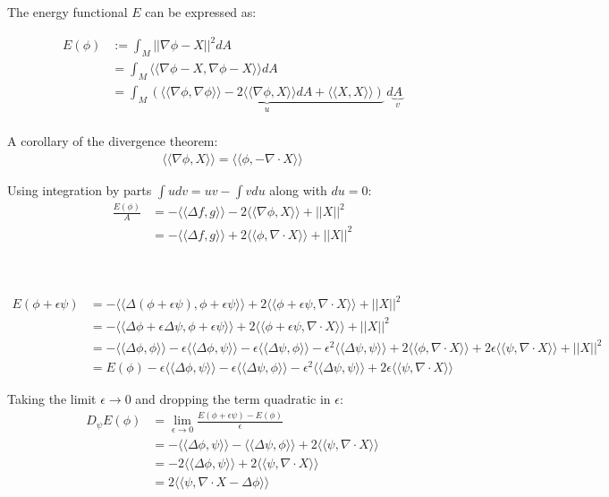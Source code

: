 \documentclass{article}
\def\grad{\nabla}
\def\lap{\Delta}
\def\ll{\langle\langle}
\def\rr{\rangle\rangle}
\begin{document}
The energy functional $E$ can be expressed as:

\begin{align*}
    E(\phi) &:= \int_M || \grad \phi - X ||^2 dA \\
        &= \int_M \ll \grad \phi - X, \grad \phi - X \rr dA \\
        &= \int_M \underbrace{(\ll \grad \phi, \grad \phi \rr - 2 \ll \grad \phi, X \rr dA + \ll X, X \rr)}_u \, d\underbrace{A}_v \\
\end{align*}

A corollary of the divergence theorem:
\begin{align}
    \ll \grad \phi, X \rr = \ll \phi, -\grad \cdot X \rr
\end{align}

Using integration by parts $\int udv = uv - \int vdu$ along with $du = 0$:
\begin{align*}
    \frac{E(\phi)}{A} &= -\ll \lap f, g \rr - 2 \ll \grad \phi, X \rr + ||X||^2 \tag*{from (1)} \\
        &= -\ll \lap f, g \rr + 2 \ll \phi, \grad \cdot X \rr + ||X||^2 \tag*{from (2)}
\end{align*}


\vspace{1.8cm}
\\\\


\begin{align*}
    E(\phi + \epsilon \psi) &= - \ll \lap (\phi + \epsilon \psi), \phi + \epsilon \psi \rr + 2 \ll \phi + \epsilon \psi, \grad \cdot X \rr + || X ||^2 \\
        &= - \ll \lap \phi + \epsilon \lap \psi, \phi + \epsilon \psi \rr + 2 \ll \phi + \epsilon \psi, \grad \cdot X \rr + || X ||^2 \\
        &= - \ll \lap \phi, \phi \rr - \epsilon \ll \lap \phi, \psi \rr - \epsilon \ll \lap \psi, \phi \rr - \epsilon^2 \ll \lap \psi, \psi \rr + 2 \ll \phi, \grad \cdot X \rr + 2 \epsilon \ll \psi, \grad \cdot X \rr + || X ||^2 \\
        &= E(\phi) - \epsilon \ll \lap \phi, \psi \rr - \epsilon \ll \lap \psi, \phi \rr - \epsilon^2 \ll \lap \psi, \psi \rr + 2 \epsilon \ll \psi, \grad \cdot X \rr
\end{align*}

Taking the limit $\epsilon \to 0$ and dropping the term quadratic in $\epsilon$:
\begin{align*}
    D_\psi E(\phi) &= \lim_{\epsilon \to 0} \frac{E(\phi + \epsilon \psi) - E(\phi)}{\epsilon} \\
        &= - \ll \lap \phi, \psi \rr - \ll \lap \psi, \phi \rr + 2 \ll \psi, \grad \cdot X \rr \\
        &= - 2 \ll \lap \phi, \psi \rr + 2 \ll \psi, \grad \cdot X \rr \\
        &= 2 \ll \psi, \grad \cdot X - \lap \phi \rr
\end{align*}
\end{document}
